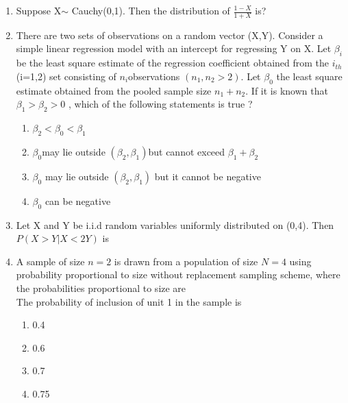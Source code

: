 \documentclass[journal,12pt,twocolumn]{IEEEtran}
\begin{document}
\begin{enumerate}[label=\arabic*.,ref=\theenumi]
\item Suppose X$\sim$ Cauchy(0,1). Then the distribution of
$\frac{1-X}{1+X}$ is?\\
\item There are two sets of observations on a random vector (X,Y). Consider a simple linear regression model with an intercept for regressing Y on X. Let $\beta_i$ be the least square estimate of the regression coefficient obtained from the $i_{th}$ (i=1,2) set consisting of $n_i $observations $(n_1, n_2 > 2)$. Let $\beta_0$ the least square estimate obtained from the pooled sample size $n_1 + n_2$. If it is known that $ \beta_1 > \beta_2 > 0$ , which of the following statements is true ?\\
\begin{enumerate}
\item $\beta_2 < \beta_0 < \beta_1$
\item $\beta_0 $may lie outside $(\beta_2, \beta_1) $but cannot exceed  $\beta_1+\beta_2 $ 
\item $\beta_0$ may lie outside $(\beta_2, \beta_1)$ but it cannot be negative
\item $\beta_0$ can be negative
\end{enumerate}
\item  Let X and Y be i.i.d random variables uniformly distributed on (0,4). Then $P(X>Y|X<2Y)$ is\\
\item A sample of size $n = 2$ is drawn from a population of size $N = 4$ using probability proportional to size
without replacement sampling scheme, where the probabilities proportional to size are\\
The probability of inclusion of unit 1 in the sample is
\begin{table}[htb]
\centering
{}
\caption{}
\end{table}
\begin{enumerate}
    \item 0.4 
    \item 0.6
    \item 0.7
    \item 0.75
\end{enumerate}

\end{enumerate}
\end{document}
